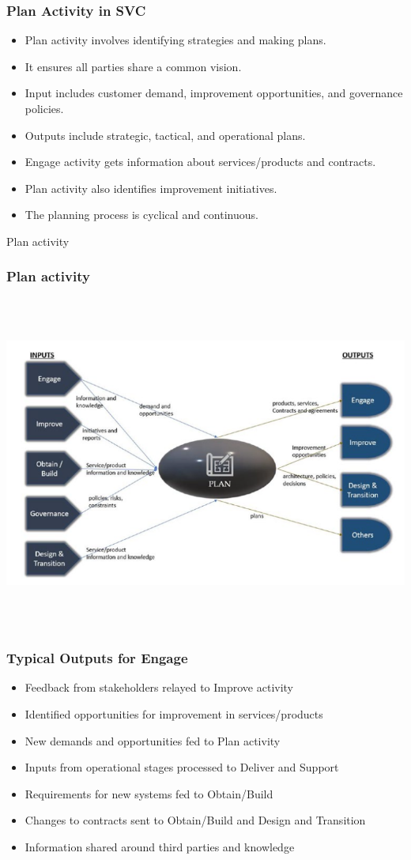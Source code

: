 \documentclass[aspectratio=169, table]{beamer}
\begin{document}
\begin{frame}
	\frametitle{Plan Activity in SVC}
	\begin{itemize}
		\item Plan activity involves identifying strategies and making plans.
		\item It ensures all parties share a common vision.
		\item Input includes customer demand, improvement opportunities, and governance policies.
		\item Outputs include strategic, tactical, and operational plans.
		\item Engage activity gets information about services/products and contracts.
		\item Plan activity also identifies improvement initiatives.
		\item The planning process is cyclical and continuous.
	\end{itemize}
\end{frame}

\begin{frame}{Plan activity} 	 \frametitle{ Plan activity} \begin{center} 	\includegraphics[width=0.6\linewidth]{images/image-03.png} \end{center} \end{frame}

\begin{frame}
	\frametitle{Typical Outputs for Engage}
	\begin{itemize}
		\item Feedback from stakeholders relayed to Improve activity
		\item Identified opportunities for improvement in services/products
		\item New demands and opportunities fed to Plan activity
		\item Inputs from operational stages processed to Deliver and Support
		\item Requirements for new systems fed to Obtain/Build
		\item Changes to contracts sent to Obtain/Build and Design and Transition
		\item Information shared around third parties and knowledge
	\end{itemize}
\end{frame}
\end{document}
